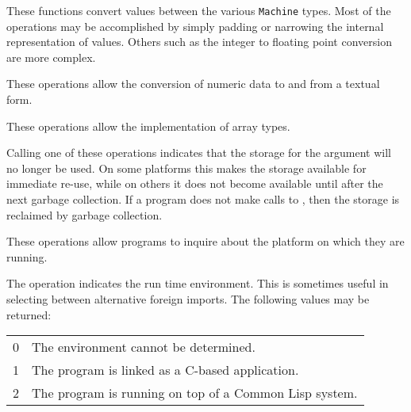 These functions convert values between the various \verb"Machine" types.
Most of the operations may be accomplished by simply padding or narrowing
the internal representation of values.
Others such as the integer to floating point conversion are more complex.

These operations allow the conversion of numeric data to and from
a textual form.

These operations allow the implementation of array types.

Calling one of these operations indicates that the storage for
the argument will no longer be used.  On some platforms this makes the
storage available for immediate re-use, while on others it does not
become available until after the next garbage collection.
If a program does not make calls to , then the storage
is reclaimed by garbage collection.

These operations allow programs
to inquire about the platform on which they are running.

The  operation indicates the run time environment.
This is sometimes useful in selecting between alternative foreign imports.
The following values may be returned:

\begin{tabular}{rl}
0 & The environment cannot be determined. \\
1 & The program is linked as a C-based application. \\
2 & The program is running on top of a Common Lisp system.
\end{tabular}

